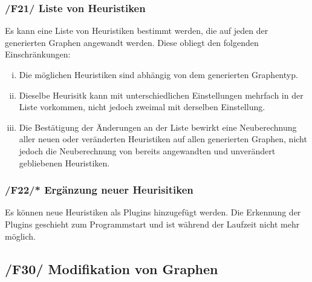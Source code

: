 \documentclass{article}
\begin{document}
	\subsubsection*{/F21/ Liste von Heuristiken} \label{f21} 
	Es kann eine Liste von Heuristiken bestimmt werden, die auf jeden der generierten Graphen angewandt werden. Diese obliegt den folgenden Einschränkungen:
	\begin{enumerate}[i)]
		\item{Die möglichen Heuristiken sind abhängig von dem generierten Graphentyp.}
		\item{Dieselbe Heurisitk kann mit unterschiedlichen Einstellungen mehrfach in der Liste vorkommen, nicht jedoch zweimal mit derselben Einstellung.}
		\item{Die Bestätigung der Änderungen an der Liste bewirkt eine Neuberechnung aller neuen oder veränderten Heuristiken auf allen generierten Graphen, nicht jedoch die Neuberechnung von bereits angewandten und unverändert gebliebenen Heuristiken.}
	\end{enumerate}
	
	\subsubsection*{/F22/* Ergänzung neuer Heurisitiken} \label{f22} 
	Es können neue Heuristiken als Plugins hinzugefügt werden. Die Erkennung der Plugins geschieht zum Programmstart und ist während der Laufzeit nicht mehr möglich.
	
	
	\newpage
	
	\subsection*{/F30/ Modifikation von Graphen} \label{f30} 
\end{document}
